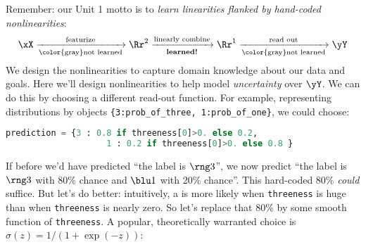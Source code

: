

  Remember: our Unit 1 motto is to \emph{learn linearities flanked by hand-coded
  nonlinearities}:
  \[
    \xX   \xrightarrow[\text{\color{gray}not learned}]{\text{featurize}}
    \Rr^2 \xrightarrow[\text{\textbf{learned!}}]{\text{linearly combine}}
    \Rr^1 \xrightarrow[\text{\color{gray}not learned}]{\text{read out}}
    \yY
  \]
  We design the nonlinearities to capture domain knowledge
  about our data and goals.  Here we'll design nonlinearities to help
  model \emph{uncertainty}
  over $\yY$.  We can do this by choosing a different read-out function.  For
  example, representing distributions by objects \texttt{\{3:prob\_of\_three,
  1:prob\_of\_one\}}, we could choose:
  \begin{lstlisting}[language=Python, basicstyle=\footnotesize\ttfamily]
      prediction = {3 : 0.8 if threeness[0]>0. else 0.2,
                    1 : 0.2 if threeness[0]>0. else 0.8 }
  \end{lstlisting}
  If before we'd have predicted ``the label is ${\rng 3}$'', we now
  predict ``the label is ${\rng 3}$ with 80\% chance and ${\blu 1}$ with 20\% chance''.
  This hard-coded 80\% \emph{could} suffice.
  But
  let's do better: intuitively, a {} is more likely when
  \texttt{threeness} is huge than when \texttt{threeness} is nearly zero.  So
  let's replace that 80\% by some smooth function of
  \texttt{threeness}.  A popular,
  theoretically warranted choice is $\sigma(z) = 1/(1+\exp(-z))$:
